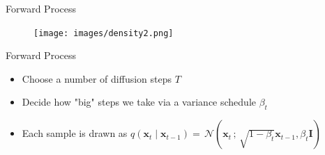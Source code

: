 \documentclass{beamer}
\begin{document}





\begin{frame}{Forward Process}

    \begin{figure}[H]
        \centering
        \texttt{[image: images/density2.png]}
    \end{figure}

\end{frame}


\begin{frame}{Forward Process}

    \begin{itemize}
        \setlength\itemsep{1.5em}
        \item Choose a number of diffusion steps $T$
        \item Decide how "big" steps we take via a variance schedule $\beta_t$
        \item Each sample is drawn as $q(\bm{x}_t \mid \bm{x}_{t-1}) = \, \mathcal{N}(\bm{x}_t \, ; \, \sqrt{1 - \beta_t} \bm{x}_{t-1}, \beta_t \bm{I})$ 
    \end{itemize}
    
\end{frame}

% 


    
\end{document}

